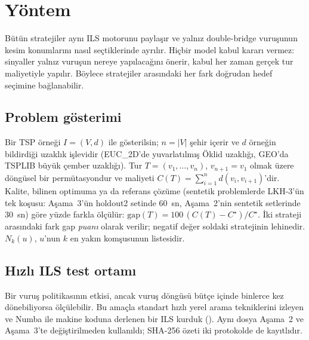 \section{Yöntem}\label{sec:yontem}

Bütün stratejiler aynı ILS motorunu paylaşır ve yalnız double-bridge vuruşunun kesim konumlarını
nasıl seçtiklerinde ayrılır. Hiçbir model kabul kararı vermez: sinyaller yalnız vuruşun nereye
yapılacağını önerir, kabul her zaman gerçek tur maliyetiyle yapılır. Böylece stratejiler
arasındaki her fark doğrudan hedef seçimine bağlanabilir.

\subsection{Problem gösterimi}\label{sec:yontem-problem}

Bir TSP örneği $I=(V,d)$ ile gösterilsin; $n=|V|$ şehir içerir ve $d$ örneğin bildirdiği uzaklık
işlevidir (EUC\_2D'de yuvarlatılmış Öklid uzaklığı, GEO'da TSPLIB büyük çember uzaklığı). Tur
$T=(v_1,\dots,v_n)$, $v_{n+1}=v_1$ olmak üzere döngüsel bir permütasyondur ve maliyeti
$C(T)=\sum_{i=1}^{n} d(v_i,v_{i+1})$'dir. Kalite, bilinen optimuma ya da referans çözüme (sentetik problemlerde LKH-3'ün tek koşusu:
Aşama~3'ün holdout2 setinde 60~sn, Aşama~2'nin sentetik setlerinde 30~sn) göre yüzde farkla ölçülür: $\mathrm{gap}(T)=100\,(C(T)-C^\star)/C^\star$. İki strateji arasındaki fark gap
\emph{puanı} olarak verilir; negatif değer soldaki stratejinin lehinedir. $N_k(u)$, $u$'nun $k$
en yakın komşusunun listesidir.

\subsection{Hızlı ILS test ortamı}\label{sec:yontem-hizli}

Bir vuruş politikasının etkisi, ancak vuruş döngüsü bütçe içinde binlerce kez dönebiliyorsa
ölçülebilir. Bu amaçla standart hızlı yerel arama tekniklerini \citep{bentley_1992_fast,
johnson_1997_case} izleyen ve Numba ile makine koduna derlenen bir ILS kurduk ().
Aynı dosya Aşama~2 ve Aşama~3'te değiştirilmeden kullanıldı; SHA-256 özeti iki protokolde de
kayıtlıdır.

